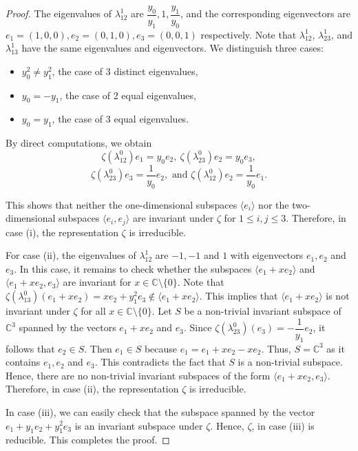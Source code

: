 \documentclass[preprint]{elsarticle}
\begin{document}
\begin{proof}
The eigenvalues of $\lambda^1_{12}$ are $\dfrac{y_0}{y_1}, 1, \dfrac{y_1}{y_0}$, and the corresponding eigenvectors are $e_1=(1,0,0), e_2=(0,1,0), e_3=(0,0,1)$ respectively.
Note that $\lambda^1_{12}$, $\lambda^1_{23}$, and $\lambda^1_{13}$ have the same eigenvalues and eigenvectors. We distinguish three cases:
\begin{itemize}
    \item[(i)] $y_0^2\neq y_1^2$, the case of 3 distinct eigenvalues,
    \item[(ii)] $y_0=-y_1$, the case of 2 equal eigenvalues,
    \item[(iii)] $y_0=y_1$, the case of 3 equal eigenvalues.
\end{itemize}
By direct computations, we obtain
$$\zeta(\lambda^0_{12})e_1=y_0e_2, ~\zeta(\lambda^0_{23})e_2=y_0e_3,$$ $$\zeta(\lambda^0_{23})e_3=\dfrac{1}{y_0}e_2, \text{ and } \zeta(\lambda^0_{12})e_2=\dfrac{1}{y_0}e_1.$$

This shows that neither the one-dimensional subspaces $\langle e_i\rangle$ nor the two-dimensional subspaces $\langle e_i,e_j\rangle$ are invariant under $\zeta$ for $1\leq i,j\leq 3$. Therefore, in case (i), the representation $\zeta$ is irreducible.

For case (ii), the eigenvalues of $\lambda^1_{12}$ are $-1, -1$ and $1$ with eigenvectors $e_1,e_2$ and $e_3$.
In this case, it remains to check whether the subspaces $\langle e_1+xe_2\rangle$ and $\langle e_1+xe_2, e_3\rangle $ are invariant for $x\in\mathbb{C}\setminus\{0\}$. Note that $\zeta(\lambda^0_{13})(e_1+xe_2)=xe_2+y_1^2e_3\not\in\langle e_1+xe_2\rangle$. This implies that $\langle e_1+xe_2\rangle$ is not invariant under $\zeta$ for all $x\in\mathbb{C}\setminus\{0\}.$ Let $S$ be a non-trivial invariant subspace of $\mathbb{C}^3$ spanned by the vectors $e_1+xe_2$ and $e_3$. Since $\zeta(\lambda^0_{23})(e_3)=-\dfrac{1}{y_1}e_2$, it follows that $e_2\in S$.
Then $e_1\in S$ because $e_1=e_1+xe_2-xe_2$. Thus, $S=\mathbb{C}^3$ as it contains $e_1, e_2$ and $e_3$.
This contradicts the fact that $S$ is a non-trivial subspace. Hence, there are no non-trivial invariant subspaces of the form $\langle e_1+xe_2, e_3\rangle$.
Therefore, in case (ii), the representation $\zeta$ is irreducible.

In case (iii), we can easily check that the subspace spanned by the vector $e_1+y_1e_2+y_1^2e_3$ is an invariant subspace under $\zeta$. Hence, $\zeta$, in case (iii) is reducible. This completes the proof.
\end{proof}
\end{document}
